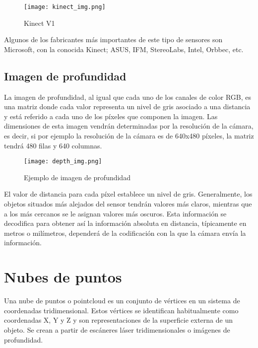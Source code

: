 \begin{figure}[h]
	\begin{center} 
		\texttt{[image: kinect\_img.png]}
	\end{center}
	\caption{Kinect V1}
	\label{fig:kinect}
\end{figure}

Algunos de los fabricantes más importantes de este tipo de sensores son Microsoft, con la conocida Kinect; ASUS, IFM, StereoLabs, Intel, Orbbec, etc.\\

\subsection{Imagen de profundidad}

La imagen de profundidad, al igual que cada uno de los canales de color RGB, es una matriz donde cada valor representa un nivel de gris asociado a una distancia y está referido a cada uno de los píxeles que componen la imagen. Las dimensiones de esta imagen vendrán determinadas por la resolución de la cámara, es decir, si por ejemplo la resolución de la cámara es de 640x480 píxeles, la matriz tendrá 480 filas y 640 columnas. \\

\begin{figure}[h]
	\begin{center} 
		\texttt{[image: depth\_img.png]}
	\end{center}
	\caption{Ejemplo de imagen de profundidad}
	\label{fig:depth}
\end{figure}


El valor de distancia para cada píxel establece un nivel de gris. Generalmente, los objetos situados más alejados del sensor tendrán valores más claros, mientras que a los más cercanos se le asignan valores más oscuros. Esta información se decodifica para obtener así la información absoluta en distancia, típicamente en metros o milímetros, dependerá de la codificación con la que la cámara envía la información.\\

\section{Nubes de puntos}

Una nube de puntos o pointcloud es un conjunto de vértices en un sistema de coordenadas tridimensional. Estos vértices se identifican habitualmente como coordenadas X, Y y Z y son representaciones de la superficie externa de un objeto. Se crean a partir de escáneres láser tridimensionales o imágenes de profundidad.\\

